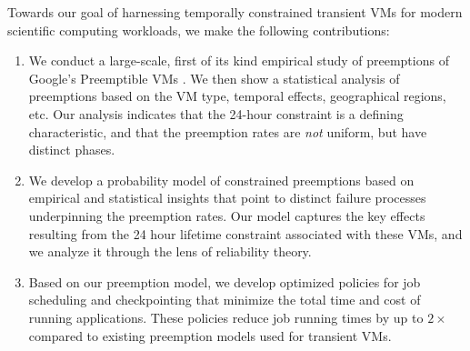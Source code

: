 Towards our goal of harnessing temporally constrained transient VMs for modern scientific computing workloads, 
we make the following contributions:
\begin{enumerate} [leftmargin=12pt]

\item We conduct a large-scale, first of its kind empirical study of preemptions of Google's Preemptible VMs \footnotemark. We then show a statistical analysis of preemptions based on the VM type, temporal effects, geographical regions, etc. Our analysis 
  indicates that the 24-hour constraint is a defining characteristic, and that the preemption rates are \emph{not} uniform, but have distinct phases. 

\item We develop a probability model of constrained preemptions based on empirical and statistical insights that point to distinct failure processes underpinning the preemption rates. Our model captures the key effects resulting from the 24 hour lifetime constraint associated with these VMs, and we analyze it through the lens of reliability theory.


\item Based on our preemption model, we develop optimized policies for job scheduling and checkpointing that minimize the total time and cost of running applications. These policies reduce job running times by up to $2\times$ compared to existing preemption models used for transient VMs. 
  


\end{enumerate}
